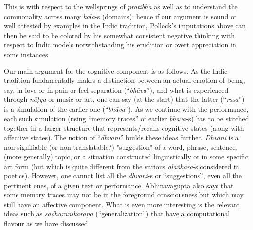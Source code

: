 This is with respect to the wellsprings of \textsl{pratibhā} as well as to understand the commonality across many \textsl{kalā}-s (domains); hence if our argument is sound or well attested by examples in the Indic tradition, Pollock’s imputations above can then be said to be colored by his somewhat consistent negative thinking with respect to Indic models notwithstanding his erudition or overt appreciation in some instances. 

Our main argument for the cognitive component is as follows. As the Indic tradition fundamentally makes a distinction between an actual emotion of being, say, in love or in pain or feel separation (“\textsl{bhāva}”), and what is experienced through \textsl{nāṭya} or music or art, one can say (at the start) that the latter (“\textsl{rasa}”) is a simulation of the earlier one (“\textsl{bhāva}”). As we continue with the performance, each such simulation (using “memory traces” of earlier \textsl{bhāva}-s) has to be stitched together in a larger structure that represents/recalls cognitive states (along with affective states). The notion of “\textsl{dhvani}” builds these ideas further. \textsl{Dhvani} is a non-signifiable (or non-translatable?) "suggestion" of a word, phrase, sentence, (more generally) topic, or a situation constructed linguistically or in some specific art form (but which is quite different from the various \textsl{alaṅkāra}-s considered in poetics). However, one cannot list all the \textsl{dhvani}-s or “suggestions”, even all the pertinent ones, of a given text or performance. Abhinavagupta also says that some memory traces may not be in the foreground consciousness but which may still have an affective component. What is even more interesting is the relevant ideas such as \textsl{sādhāraṇīkaraṇa} (“generalization”) that have a computational flavour as we have discussed.

